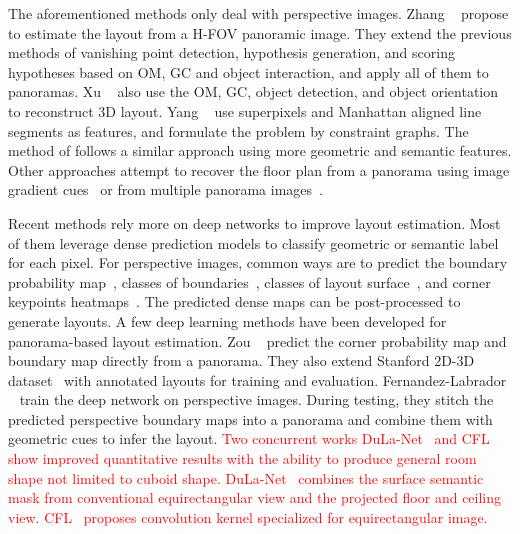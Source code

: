 \documentclass[10pt,twocolumn,letterpaper]{article}
\newcommand{\threesixty}{\text{360}\xspace}
\newcommand{\revise}[1]{\textcolor{red}{#1}}
\newcommand{\revise}[1]{#1}
\begin{document}
The aforementioned methods only deal with perspective images. Zhang \etal~\cite{zhang2014panocontext} propose to estimate the layout from a \threesixty H-FOV panoramic image. They extend the previous methods of vanishing point detection, hypothesis generation, and scoring hypotheses based on OM, GC and object interaction, and apply all of them to panoramas. Xu \etal~\cite{xu2017pano2cad} also use the OM, GC, object detection, and object orientation to reconstruct 3D layout. Yang \etal~\cite{yang2016efficient} use superpixels and Manhattan aligned line segments as features, and formulate the problem by constraint graphs. The method of \cite{yang2018automatic} follows a similar approach using more geometric and semantic features. Other approaches attempt to recover the floor plan from a panorama using image gradient cues~\cite{pintore2016omnidirectional} or from multiple panorama images~\cite{cabral2014piecewise}.


Recent methods rely more on deep networks to improve layout estimation.
Most of them leverage dense prediction models to classify geometric or semantic label for each pixel.
For perspective images, common ways are to predict the boundary probability map~\cite{mallya2015learning,ren2016coarse}, classes of boundaries~\cite{zhao2017physics,ren2016coarse}, classes of layout surface~\cite{dasgupta2016delay,izadinia2017im2cad}, and corner keypoints heatmaps~\cite{lee2017roomnet}.
The predicted dense maps can be post-processed to generate layouts.
A few deep learning methods have been developed for panorama-based layout estimation.
Zou \etal~\cite{zou2018layoutnet} predict the corner probability map and boundary map directly from a panorama.
They also extend Stanford 2D-3D dataset~\cite{2017arXiv170201105A} with annotated layouts for training and evaluation.
Fernandez-Labrador \etal~\cite{fernandez2018layouts} train the deep network on perspective images.
During testing, they stitch the predicted perspective boundary maps into a panorama and combine them with geometric cues to infer the layout.
\revise{
Two concurrent works DuLa-Net~\cite{yang2018dula} and CFL~\cite{fernandez2019CFL} show improved quantitative results with the ability to produce general room shape not limited to cuboid shape.
DuLa-Net~\cite{yang2018dula} combines the surface semantic mask from conventional equirectangular view and the projected floor and ceiling view.
CFL~\cite{fernandez2019CFL} proposes convolution kernel specialized for equirectangular image.
}
\end{document}
